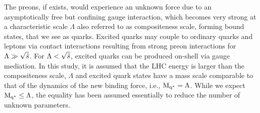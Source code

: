 The preons, if exists, would experience an unknown force due to an asymptotically free but confining gauge interaction, which becomes very 
strong at a characteristic scale $\Lambda$ also referred to as compositeness scale, forming bound  states, that we see as quarks. Excited 
quarks may couple to ordinary quarks and leptons via contact interactions resulting from strong preon interactions for $\Lambda\gg\sqrt{\hat{s}}$. 
For $\Lambda<\sqrt{\hat{s}}$, excited quarks can be produced on-shell via gauge mediation. In this study, it is assumed that the LHC energy is 
larger than the compositeness scale, $\Lambda$ and excited quark states have a mass scale comparable to that of the dynamics of the new
binding force, i.e., $\mathrm{M_{q^\star}}=\Lambda$. While we expect $\mathrm{M_{q^\star}} \le \Lambda$, the equality has been assumed essentially to reduce the number
of unknown parameters.

